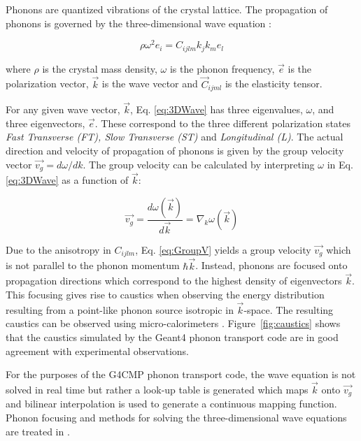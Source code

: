 \documentclass[final,3p,times,twocolumn]{elsarticle}
\begin{document}
Phonons are quantized vibrations of the crystal lattice. The propagation of phonons is governed by the three-dimensional wave equation \cite{Wolfe}:

\begin{equation}
\label{eq:3DWave}
\rho \omega ^2e_i=C_{ijlm}k_jk_me_l
\end{equation}

where $\rho$ is the crystal mass density, $\omega$ is the phonon frequency, $\vec{e}$ is the polarization vector, $\vec{k}$ is the wave vector and $\vec{C}_{ijml}$ is the elasticity tensor.

For any given wave vector, $\vec{k}$, Eq. \ref{eq:3DWave} has three eigenvalues, $\omega$, and three eigenvectors, $\vec{e}$. These correspond to the three different polarization states \textit{Fast Transverse (FT), Slow Transverse (ST)} and \textit{Longitudinal (L)}. The actual direction and velocity of propagation of phonons is given by the group velocity vector $\vec{v_g} = d\omega/dk$. The group velocity can be calculated by interpreting $\omega$ in Eq. \ref{eq:3DWave} as a function of $\vec{k}$:

\begin{equation}
\label{eq:GroupV}
\vec{v_g}=\frac{d \omega (\vec{k})}{d\vec{k}}=\nabla_k \omega (\vec{k})
\end{equation}

Due to the anisotropy in $C_{ijlm}$, Eq. \ref{eq:GroupV} yields a group velocity $\vec{v_g}$ which is not parallel to the phonon momentum $\hbar\vec{k}$. Instead, phonons are focused onto propagation directions which correspond to the highest density of eigenvectors $\vec{k}$. This focusing gives rise to caustics when observing the energy  distribution resulting from a point-like phonon source isotropic in $\vec{k}$-space. The resulting caustics can be observed using micro-calorimeters \cite{Nothrop}. Figure~\ref{fig:caustics} shows that the caustics simulated by the Geant4 phonon transport code are in good agreement with experimental observations. 

For the purposes of the G4CMP phonon transport code, the wave equation is not solved in real time but rather a look-up table is generated which maps $\vec{k}$ onto $\vec{v_g}$ and bilinear interpolation is used to generate a continuous mapping function. Phonon focusing and methods for solving the three-dimensional wave equations are treated in \cite{Wolfe}. %
\end{document}

